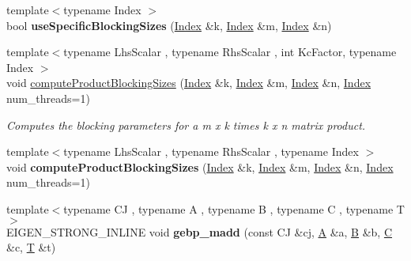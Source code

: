 \begin{DoxyCompactItemize}
{\footnotesize template$<$typename Index $>$ }\\bool {\bfseries use\+Specific\+Blocking\+Sizes} (\hyperlink{namespace_eigen_a62e77e0933482dafde8fe197d9a2cfde}{Index} \&k, \hyperlink{namespace_eigen_a62e77e0933482dafde8fe197d9a2cfde}{Index} \&m, \hyperlink{namespace_eigen_a62e77e0933482dafde8fe197d9a2cfde}{Index} \&n)
\item 
{\footnotesize template$<$typename Lhs\+Scalar , typename Rhs\+Scalar , int Kc\+Factor, typename Index $>$ }\\void \hyperlink{namespace_eigen_1_1internal_a85af7f706f2ecd66aaa5a088fc32cbcc}{compute\+Product\+Blocking\+Sizes} (\hyperlink{namespace_eigen_a62e77e0933482dafde8fe197d9a2cfde}{Index} \&k, \hyperlink{namespace_eigen_a62e77e0933482dafde8fe197d9a2cfde}{Index} \&m, \hyperlink{namespace_eigen_a62e77e0933482dafde8fe197d9a2cfde}{Index} \&n, \hyperlink{namespace_eigen_a62e77e0933482dafde8fe197d9a2cfde}{Index} num\+\_\+threads=1)
\begin{DoxyCompactList}\small\item\em Computes the blocking parameters for a m x k times k x n matrix product. \end{DoxyCompactList}\item 
\mbox{\label{namespace_eigen_1_1internal_a666defcfcf2cee6d50436b4144abd49b}} 
{\footnotesize template$<$typename Lhs\+Scalar , typename Rhs\+Scalar , typename Index $>$ }\\void {\bfseries compute\+Product\+Blocking\+Sizes} (\hyperlink{namespace_eigen_a62e77e0933482dafde8fe197d9a2cfde}{Index} \&k, \hyperlink{namespace_eigen_a62e77e0933482dafde8fe197d9a2cfde}{Index} \&m, \hyperlink{namespace_eigen_a62e77e0933482dafde8fe197d9a2cfde}{Index} \&n, \hyperlink{namespace_eigen_a62e77e0933482dafde8fe197d9a2cfde}{Index} num\+\_\+threads=1)
\item 
\mbox{\label{namespace_eigen_1_1internal_a19c9093d838e8dd9c5fc18ff208f8ad6}} 
{\footnotesize template$<$typename CJ , typename A , typename B , typename C , typename T $>$ }\\E\+I\+G\+E\+N\+\_\+\+S\+T\+R\+O\+N\+G\+\_\+\+I\+N\+L\+I\+NE void {\bfseries gebp\+\_\+madd} (const CJ \&cj, \hyperlink{group___core___module_class_eigen_1_1_matrix}{A} \&a, \hyperlink{group___core___module_class_eigen_1_1_matrix}{B} \&b, \hyperlink{group___core___module}{C} \&c, \hyperlink{group___sparse_core___module}{T} \&t)
\item 

\end{DoxyCompactItemize}
